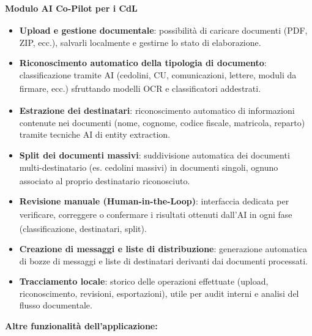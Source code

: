 ﻿\documentclass[a4paper,11pt]{article}
\begin{document}
\textbf{Modulo\textsubscript{} AI Co-Pilot\textsubscript{} per i CdL\textsubscript{}}
\begin{itemize}
    \item \textbf{Upload e gestione documentale}: 
    possibilità di caricare documenti (PDF, ZIP, ecc.), salvarli localmente e gestirne lo stato di elaborazione.
    
    \item \textbf{Riconoscimento automatico della tipologia di documento}: 
    classificazione tramite AI (cedolini\textsubscript{}, CU, comunicazioni, lettere, moduli da firmare, ecc.) 
    sfruttando modelli OCR\textsubscript{} e classificatori addestrati.
    
    \item \textbf{Estrazione dei destinatari}: 
    riconoscimento automatico di informazioni contenute nei documenti 
    (nome, cognome, codice fiscale, matricola, reparto) tramite tecniche AI di entity extraction.
    
    \item \textbf{Split dei documenti massivi}: 
    suddivisione automatica dei documenti multi-destinatario (es. cedolini massivi\textsubscript{}) 
    in documenti singoli, ognuno associato al proprio destinatario riconosciuto.
    
    \item \textbf{Revisione manuale (Human-in-the-Loop)}: 
    interfaccia\textsubscript{} dedicata per verifica\textsubscript{}re, correggere o confermare i risultati ottenuti dall'AI\textsubscript{} 
    in ogni fase (classificazione, destinatari, split).
    
    \item \textbf{Creazione di messaggi e liste di distribuzione}: 
    generazione automatica di bozze di messaggi e liste di destinatari derivanti dai documenti processati.
    
    \item \textbf{Tracciamento locale}: 
    storico delle operazioni effettuate (upload, riconoscimento, revisioni, esportazioni), 
    utile per audit interni e analisi del flusso documentale.
\end{itemize}  
\textbf{Altre funzionalità\textsubscript{} dell'applicazione:}
\end{document}
